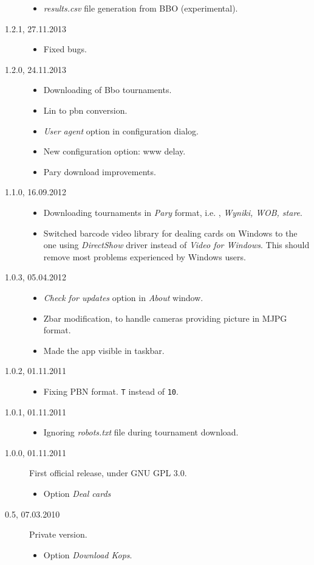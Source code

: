 \documentclass[polish,a4paper,11pt,oneside]{article}
\begin{document}
\begin{description}
\begin{itemize}
  \item {\em results.csv} file generation from BBO (experimental).
  \end{itemize}
\item[1.2.1, 27.11.2013]
  \begin{itemize}
  \item Fixed bugs.
  \end{itemize}
\item[1.2.0, 24.11.2013]
  \begin{itemize}
  \item Downloading of Bbo tournaments.
  \item Lin to pbn conversion.
  \item {\em User agent} option in configuration dialog.
  \item New configuration option: www delay.
  \item Pary download improvements.
  \end{itemize}
\item[1.1.0, 16.09.2012]
  \begin{itemize}
  \item Downloading tournaments in {\em Pary} format,
        i.e. 
        , {\em Wyniki, WOB, stare}.
  \item Switched barcode video library for dealing cards on Windows
        to the one using
        {\em DirectShow} driver instead of
        {\em Video for Windows}. This should remove most problems
        experienced by Windows users.
  \end{itemize}
\item[1.0.3, 05.04.2012]
  \begin{itemize}
  \item {\em Check for updates} option in {\em About} window.
  \item Zbar modification, to handle cameras providing picture in
        MJPG format.
  \item Made the app visible in taskbar.
  \end{itemize}
\item[1.0.2, 01.11.2011]
  \begin{itemize}
  \item Fixing PBN format. \verb!T! instead of \verb!10!.
  \end{itemize}
\item[1.0.1, 01.11.2011]
  \begin{itemize}
  \item Ignoring {\em robots.txt} file during tournament download.
  \end{itemize}
\item[1.0.0, 01.11.2011]
  First official release, under GNU GPL 3.0.
  \begin{itemize}
  \item Option {\em Deal cards}
  \end{itemize}
\item[0.5, 07.03.2010]
  Private version.
  \begin{itemize}
  \item Option {\em Download Kops}.
  \end{itemize}
\end{description}
\end{document}
